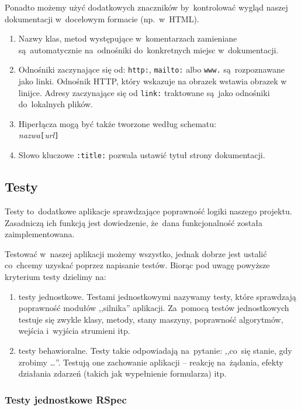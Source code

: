 Ponadto możemy użyć dodatkowych znaczników by~kontrolować wygląd naszej dokumentacji w~docelowym formacie (np.~w~HTML).

\begin{enumerate}
  \item Nazwy klas, metod występujące w~komentarzach zamieniane są~automatycznie na~odnośniki do~konkretnych miejsc w~dokumentacji.
  \item Odnośniki zaczynające się od: \texttt{http:}, \texttt{mailto:} albo \texttt{www.} są~rozpoznawane jako linki. Odnośnik HTTP, który wskazuje na obrazek wstawia obrazek w linijce. Adresy zaczynające się od \texttt{link:} traktowane są~jako odnośniki do~lokalnych plików.
  \item Hiperłącza mogą być także tworzone według schematu:\\
    \textit{nazwa}\texttt{[}\textit{url}\texttt{]}
  \item Słowo kluczowe \texttt{:title:} pozwala ustawić tytuł strony dokumentacji.
\end{enumerate}

\subsection{Testy} \label{dokumentacja.testy}

Testy to~dodatkowe aplikacje sprawdzające poprawność logiki naszego projektu. Zasadniczą ich funkcją jest dowiedzenie, że~dana funkcjonalność została zaimplementowana.


Testować w~naszej aplikacji możemy wszystko, jednak dobrze jest ustalić co~chcemy uzyskać poprzez napisanie testów. Biorąc pod uwagę powyższe kryterium testy dzielimy na:

\begin{enumerate}
 \item testy jednostkowe. Testami jednostkowymi nazywamy testy, które sprawdzają poprawność modułów ,,silnika'' aplikacji. Za~pomocą testów jednostkowych testuje się zwykle klasy, metody, stany maszyny, poprawność algorytmów, wejścia i~wyjścia strumieni itp.
 \item testy behawioralne. Testy takie odpowiadają na~pytanie: ,,co~się stanie, gdy zrobimy \ldots''. Testują one zachowanie aplikacji -- reakcję na~żądania, efekty działania zdarzeń (takich jak wypełnienie formularza) itp.
\end{enumerate}

\subsubsection{Testy jednostkowe RSpec} \label{dokumentacja.rspec}

